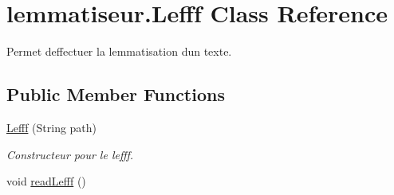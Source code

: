 \hypertarget{classlemmatiseur_1_1_lefff}{}\section{lemmatiseur.\+Lefff Class Reference}
\label{classlemmatiseur_1_1_lefff}


Permet d\textquotesingle{}effectuer la lemmatisation d\textquotesingle{}un texte.  


\subsection*{Public Member Functions}
\begin{DoxyCompactItemize}
\item 
\hyperlink{classlemmatiseur_1_1_lefff_a52a0d72ac29d959c1f44152a6a748bcf}{Lefff} (String path)
\begin{DoxyCompactList}\small\item\em Constructeur pour le lefff. \end{DoxyCompactList}\item 
void \hyperlink{classlemmatiseur_1_1_lefff_a75daf1c87611021a0cbeba0904658455}{read\+Lefff} ()\hypertarget{classlemmatiseur_1_1_lefff_a75daf1c87611021a0cbeba0904658455}{}\label{classlemmatiseur_1_1_lefff_a75daf1c87611021a0cbeba0904658455}


\end{DoxyCompactItemize}
